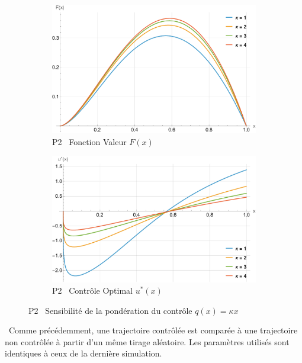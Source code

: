 \FloatBarrier\begin{figure}[htb]
    \centering
    \begin{subfigure}{0.45\linewidth}
        \includegraphics[width=\linewidth]{img/validation/P2/p2_K_value.pdf}
        \caption{P2 \textemdash~Fonction Valeur $F(x)$}\label{fig:KappaValueVisualisation2}
    \end{subfigure}
    \hfill
    \begin{subfigure}{0.45\linewidth}
        \includegraphics[width=\linewidth]{img/validation/P2/p2_K_control.pdf}
        \caption{P2 \textemdash~Contrôle Optimal $u^*(x)$}\label{fig:KappaControlVisualisation2}
    \end{subfigure}
    \caption{P2 \textemdash~Sensibilité de la pondération du contrôle $q(x)=\kappa x$}\label{fig:KappaValueControlComparison2}
\end{figure}
\FloatBarrier~Comme précédemment, une trajectoire contrôlée est comparée à une trajectoire non contrôlée à partir d'un même tirage aléatoire. Les paramètres utilisés sont identiques à ceux de la dernière simulation.
